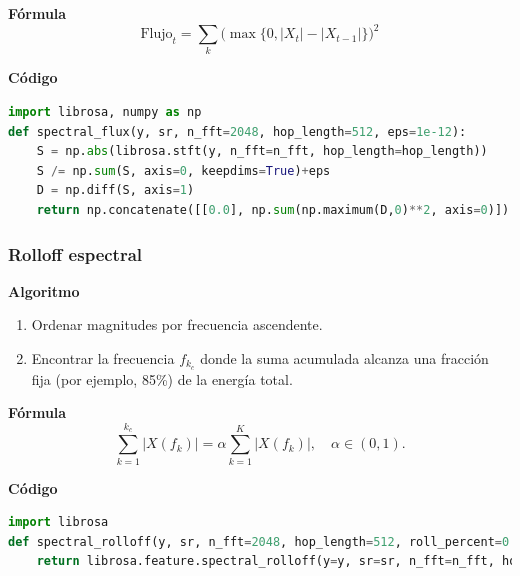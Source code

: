 \textbf{Fórmula}
\[
  \text{Flujo}_t=\sum_k\big(\max\{0, |X_t|-|X_{t-1}|\}\big)^2
\]

\textbf{Código}
\begin{lstlisting}[language=Python, label={lst:flux_code}, caption={Flujo espectral}]
import librosa, numpy as np
def spectral_flux(y, sr, n_fft=2048, hop_length=512, eps=1e-12):
    S = np.abs(librosa.stft(y, n_fft=n_fft, hop_length=hop_length))
    S /= np.sum(S, axis=0, keepdims=True)+eps
    D = np.diff(S, axis=1)
    return np.concatenate([[0.0], np.sum(np.maximum(D,0)**2, axis=0)])
\end{lstlisting}

\subsubsection{Rolloff espectral}
\textbf{Algoritmo} \parencite{tzanetakis2002musical, peeters2004large}
\begin{enumerate}
  \item Ordenar magnitudes por frecuencia ascendente.
  \item Encontrar la frecuencia \(f_{k_c}\) donde la suma acumulada alcanza una fracción fija (por ejemplo, 85\%) de la energía total.
\end{enumerate}

\textbf{Fórmula}
\[
  \sum_{k=1}^{k_c}|X(f_k)|=\alpha\sum_{k=1}^{K}|X(f_k)|,\quad \alpha\in(0,1).
\]

\textbf{Código}
\begin{lstlisting}[language=Python, label={lst:rolloff_code}, caption={Rolloff espectral}]
import librosa
def spectral_rolloff(y, sr, n_fft=2048, hop_length=512, roll_percent=0.85):
    return librosa.feature.spectral_rolloff(y=y, sr=sr, n_fft=n_fft, hop_length=hop_length, roll_percent=roll_percent)[0]
\end{lstlisting}

